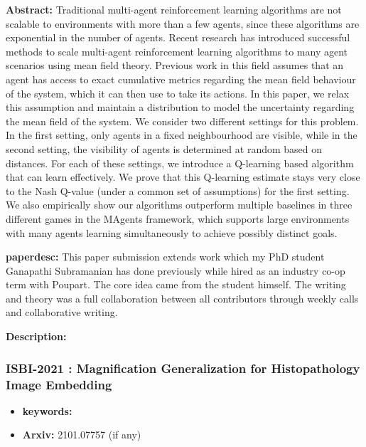 \documentclass{article}
\begin{document}

\textbf{Abstract:} Traditional multi-agent reinforcement learning algorithms are not scalable to environments with more than a few agents, since these algorithms are exponential in the number of agents. Recent research has introduced successful methods to scale multi-agent reinforcement learning algorithms to many agent scenarios using mean field theory. Previous work in this field assumes that an agent has access to exact cumulative metrics regarding the mean field behaviour of the system, which it can then use to take its actions. In this paper, we relax this assumption and maintain a distribution to model the uncertainty regarding the mean field of the system. We consider two different settings for this problem. In the first setting, only agents in a fixed neighbourhood are visible, while in the second setting, the visibility of agents is determined at random based on distances. For each of these settings, we introduce a Q-learning based algorithm that can learn effectively. We prove that this Q-learning estimate stays very close to the Nash Q-value (under a common set of assumptions) for the first setting. We also empirically show our algorithms outperform multiple baselines in three different games in the MAgents framework, which supports large environments with many agents learning simultaneously to achieve possibly distinct goals.

\textbf{paperdesc:} This paper submission extends work which my PhD student Ganapathi Subramanian has done previously while hired as an industry co-op term with Poupart. The core idea came from the student himself. The writing and theory was a full collaboration between all contributors through weekly calls and collaborative writing.

\textbf{Description:} 



\newpage
\subsubsection{\textbf{ISBI-2021} : Magnification Generalization for Histopathology Image Embedding}
\begin{itemize}
\item \textbf{keywords:} 
\item \textbf{Arxiv:} 2101.07757 (if any)
\end{itemize}
\end{document}
